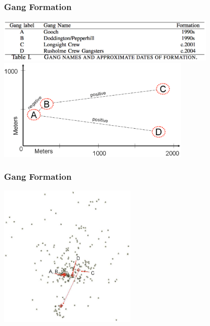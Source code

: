 \documentclass[pdftex]{beamer}
\begin{document}
\begin{frame}
\frametitle{Gang Formation}
\begin{center}
\includegraphics[width=0.8\textwidth]{../images/gangs.png}\newline\newline
\includegraphics[width=0.7\textwidth]{../images/positive.pdf}
\end{center}
\end{frame}

\begin{frame}
\frametitle{Gang Formation}
\begin{center}
\includegraphics[width=0.5\textwidth]{../images/serious.pdf}
\end{center}
\end{frame}
\end{document}
